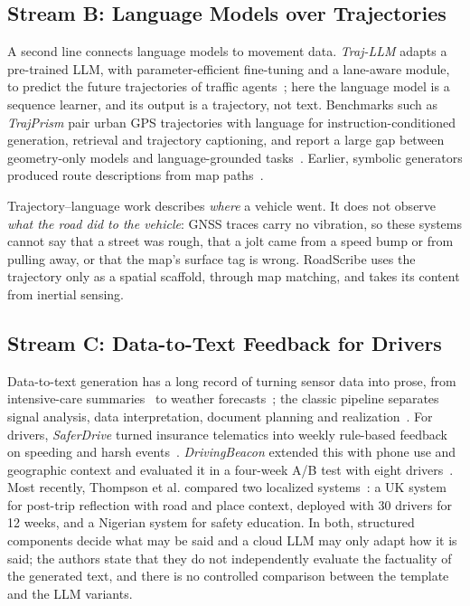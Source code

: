 \subsection{Stream B: Language Models over Trajectories}

A second line connects language models to movement data.
\emph{Traj-LLM} adapts a pre-trained LLM, with parameter-efficient fine-tuning and a lane-aware module, to predict the future trajectories of traffic agents~\cite{lan2024trajllm}; here the language model is a sequence learner, and its output is a trajectory, not text.
Benchmarks such as \emph{TrajPrism} pair urban GPS trajectories with language for instruction-conditioned generation, retrieval and trajectory captioning, and report a large gap between geometry-only models and language-grounded tasks~\cite{li2026trajprism}.
Earlier, symbolic generators produced route descriptions from map paths~\cite{dale2005route}.

Trajectory--language work describes \emph{where} a vehicle went.
It does not observe \emph{what the road did to the vehicle}: GNSS traces carry no vibration, so these systems cannot say that a street was rough, that a jolt came from a speed bump or from pulling away, or that the map's surface tag is wrong.
RoadScribe uses the trajectory only as a spatial scaffold, through map matching, and takes its content from inertial sensing.

\subsection{Stream C: Data-to-Text Feedback for Drivers}

Data-to-text generation has a long record of turning sensor data into prose, from intensive-care summaries~\cite{portet2009babytalk} to weather forecasts~\cite{reiter2005sumtime}; the classic pipeline separates signal analysis, data interpretation, document planning and realization~\cite{gatt2018survey}.
For drivers, \emph{SaferDrive} turned insurance telematics into weekly rule-based feedback on speeding and harsh events~\cite{braun2018saferdrive}.
\emph{DrivingBeacon} extended this with phone use and geographic context and evaluated it in a four-week A/B test with eight drivers~\cite{baig2022drivingbeacon}.
Most recently, Thompson et al. compared two localized systems~\cite{thompson2026localising}: a UK system for post-trip reflection with road and place context, deployed with 30 drivers for 12 weeks, and a Nigerian system for safety education.
In both, structured components decide what may be said and a cloud LLM may only adapt how it is said; the authors state that they do not independently evaluate the factuality of the generated text, and there is no controlled comparison between the template and the LLM variants.

